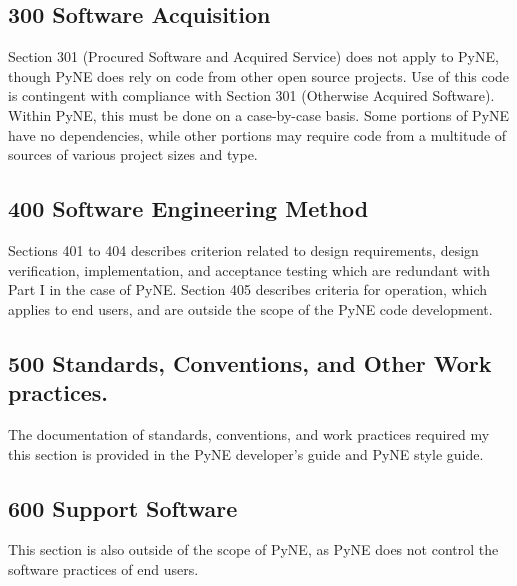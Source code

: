 \documentclass{anstrans}
\begin{document}
\subsection{300 Software Acquisition}

Section 301 (Procured Software and Acquired Service) does not apply to PyNE,
though PyNE does rely on code from other open source projects. Use of this code
is contingent with compliance with Section 301 (Otherwise Acquired Software).
Within PyNE, this must be done on a case-by-case basis. Some portions of PyNE
have no dependencies, while other portions may require code from a multitude of
sources of various project sizes and type.



\subsection{400 Software Engineering Method}

Sections 401 to 404 describes criterion related to design requirements, design
verification, implementation, and acceptance testing which are redundant with
Part I in the case of PyNE. Section 405 describes criteria for operation, which
applies to end users, and are outside the scope of the PyNE code development.


\subsection{500 Standards, Conventions, and Other Work practices.}

The documentation of standards, conventions, and work practices required my
this section is provided in the PyNE developer's guide and PyNE style guide.

\subsection{600 Support Software}

This section is also outside of the scope of PyNE, as PyNE does not control the
software practices of end users.
\end{document}
